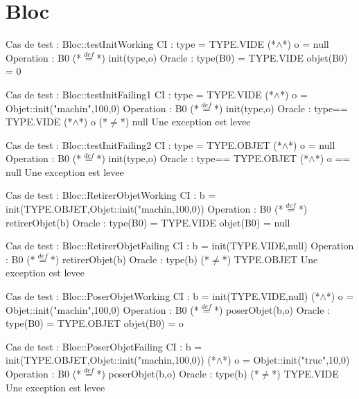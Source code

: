 \documentclass[a4paper, 11pt, notitlepage]{report}
\begin{document}
\section*{Bloc}
\begin{Test}

Cas de test  : Bloc::testInitWorking
CI : type = TYPE.VIDE (*$\land$*) o = null
Operation : B0 (*$\stackrel{def}{=}$*) init(type,o)
Oracle :
	type(B0) = TYPE.VIDE
	objet(B0) = 0

Cas de test  : Bloc::testInitFailing1
CI :  type = TYPE.VIDE (*$\land$*) o = Objet::init("machin",100,0)
Operation : B0 (*$\stackrel{def}{=}$*) init(type,o)
Oracle :
	type== TYPE.VIDE (*$\land$*) o (*$\ne$*) null
	Une exception est levee

Cas de test  : Bloc::testInitFailing2
CI :  type = TYPE.OBJET (*$\land$*) o = null
Operation : B0 (*$\stackrel{def}{=}$*) init(type,o)
Oracle :
	type== TYPE.OBJET (*$\land$*) o == null
	Une exception est levee

Cas de test : Bloc::RetirerObjetWorking
CI : b = init(TYPE.OBJET,Objet::init("machin,100,0))
Operation : B0 (*$\stackrel{def}{=}$*) retirerObjet(b)
Oracle :
	type(B0) = TYPE.VIDE
	objet(B0) = null

Cas de test : Bloc::RetirerObjetFailing
CI : b = init(TYPE.VIDE,null)
Operation : B0 (*$\stackrel{def}{=}$*) retirerObjet(b)
Oracle :
	type(b) (*$\ne$*) TYPE.OBJET
	Une exception est levee 

Cas de test : Bloc::PoserObjetWorking
CI : b = init(TYPE.VIDE,null) (*$\land$*) o = Objet::init("machin",100,0)
Operation : B0 (*$\stackrel{def}{=}$*) poserObjet(b,o)
Oracle :
	type(B0) = TYPE.OBJET
	objet(B0) = o

Cas de test : Bloc::PoserObjetFailing
CI : b = init(TYPE.OBJET,Objet::init("machin,100,0)) (*$\land$*) o = Objet::init("truc",10,0)
Operation : B0 (*$\stackrel{def}{=}$*) poserObjet(b,o)
Oracle :
	type(b) (*$\ne$*) TYPE.VIDE
	Une exception est levee 
\end{Test}
 
\end{document}
